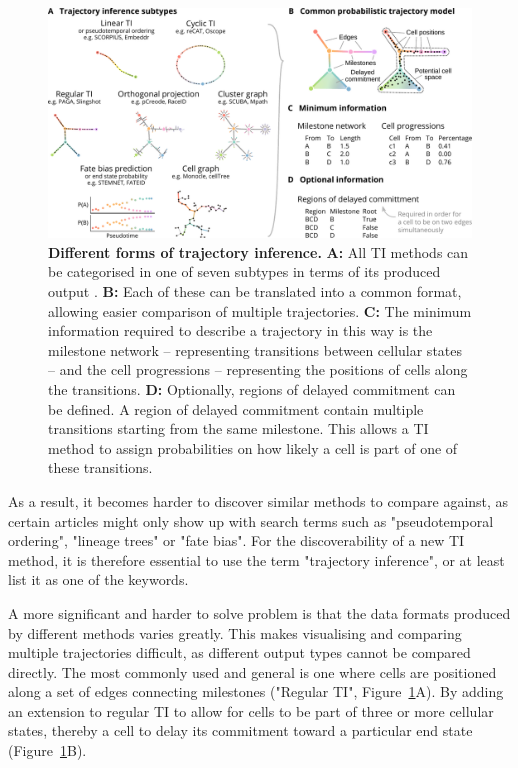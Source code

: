 \begin{figure}[htb!]
	\centering
	\includegraphics[width=\linewidth]{fig/method_types.pdf} 
	\caption{
		\textbf{Different forms of trajectory inference.}
		\textbf{A:} All TI methods can be categorised in one of seven subtypes in terms of its produced output \cite{saelens_comparisonsinglecelltrajectory_2019}.
		\textbf{B:} Each of these can be translated into a common format, allowing easier comparison of multiple trajectories.
		\textbf{C:} The minimum information required to describe a trajectory in this way is the milestone network -- representing transitions between cellular states -- and the cell progressions -- representing the positions of cells along the transitions.
		\textbf{D:} Optionally, regions of delayed commitment can be defined. A region of delayed commitment contain multiple transitions starting from the same milestone. This allows a TI method to assign probabilities on how likely a cell is part of one of these transitions.
	}
	\label{fig:method_types}
\end{figure}

As a result, it becomes harder to discover similar methods to compare against, as certain articles might only show up with search terms such as "pseudotemporal ordering", "lineage trees" or "fate bias". For the discoverability of a new TI method, it is therefore essential to use the term "trajectory inference", or at least list it as one of the keywords. 

A more significant and harder to solve problem is that the data formats produced by different methods varies greatly. This makes visualising and comparing multiple trajectories difficult, as different output types cannot be compared directly. The most commonly used and general is one where cells are positioned along a set of edges connecting milestones ("Regular TI", Figure~\ref{fig:method_types}A). 
By adding an extension to regular TI to allow for cells to be part of three or more cellular states, thereby a cell to delay its commitment toward a particular end state (Figure~\ref{fig:method_types}B). 

